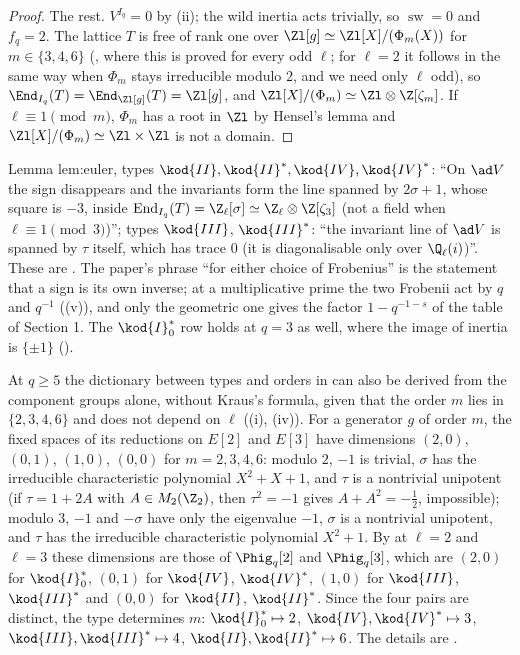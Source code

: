 \begin{proof}
The rest. $V^{I_q}=0$ by (ii); the wild inertia acts trivially, so $\operatorname{sw}=0$ and $f_q=2$. The lattice $T$ is free of rank
one over $\Zl[g]\simeq\Zl[X]/(\Phi_m(X))$ for $m\in\{3,4,6\}$ (, where this is proved for every odd $\ell$; for $\ell=2$ it follows in the
same way when $\Phi_m$ stays irreducible modulo $2$, and we need only $\ell$ odd), so $\End_{I_q}(T)=\End_{\Zl[g]}(T)=\Zl[g]$, and
$\Zl[X]/(\Phi_m)\simeq\Zl\otimes\Z[\zeta_m]$. If $\ell\equiv1\pmod m$, $\Phi_m$ has a root in $\Zl$ by Hensel's lemma and $\Zl[X]/(\Phi_m)\simeq\Zl\times\Zl$ is not a domain.
\end{proof}

\begin{paperlink}
Lemma lem:euler, types $\kod{II},\kod{II}^*,\kod{IV},\kod{IV}^*$: ``On $\ad V$ the sign disappears and the invariants form the line spanned by
$2\sigma+1$, whose square is $-3$, inside $\operatorname{End}_{I_q}(T)=\Z_\ell[\sigma]\simeq\Z_\ell\otimes\Z[\zeta_3]$ (not a field when
$\ell\equiv1\pmod3$)''; types $\kod{III}$, $\kod{III}^*$: ``the invariant line of $\ad V$ is spanned by $\tau$ itself, which has trace $0$ (it is
diagonalisable only over $\Q_\ell(i)$)''. These are . The paper's phrase ``for either choice of Frobenius'' is the
statement that a sign is its own inverse; at a multiplicative prime the two Frobenii act by $q$ and $q^{-1}$ ((v)), and
only the geometric one gives the factor $1-q^{-1-s}$ of the table of Section 1. The $\kod{I}_0^*$ row holds at $q=3$ as well, where the image of
inertia is $\{\pm1\}$ ().
\end{paperlink}

\begin{remark}\label{rem:galrep:kraus-from-components}
At $q\ge5$ the dictionary between types and orders in  can also be derived from the component groups alone,
without Kraus's formula, given that the order $m$ lies in $\{2,3,4,6\}$ and does not depend on $\ell$ ((i), (iv)). For
a generator $g$ of order $m$, the fixed spaces of its reductions on $E[2]$ and $E[3]$ have dimensions $(2,0)$, $(0,1)$, $(1,0)$, $(0,0)$ for
$m=2,3,4,6$: modulo $2$, $-1$ is trivial, $\sigma$ has the irreducible characteristic polynomial $X^2+X+1$, and $\tau$ is a nontrivial unipotent (if
$\tau=1+2A$ with $A\in M_2(\Z_2)$, then $\tau^2=-1$ gives $A+A^2=-\frac12$, impossible); modulo $3$, $-1$ and $-\sigma$ have only the eigenvalue $-1$,
$\sigma$ is a nontrivial unipotent, and $\tau$ has the irreducible characteristic polynomial $X^2+1$. By  at
$\ell=2$ and $\ell=3$ these dimensions are those of $\Phig_q[2]$ and $\Phig_q[3]$, which are $(2,0)$ for $\kod{I}_0^*$, $(0,1)$ for $\kod{IV}$, $\kod{IV}^*$,
$(1,0)$ for $\kod{III}$, $\kod{III}^*$ and $(0,0)$ for $\kod{II}$, $\kod{II}^*$. Since the four pairs are distinct, the type determines $m$:
$\kod{I}_0^*\mapsto2$, $\kod{IV},\kod{IV}^*\mapsto3$, $\kod{III},\kod{III}^*\mapsto4$, $\kod{II},\kod{II}^*\mapsto6$. The details are .
\end{remark}

